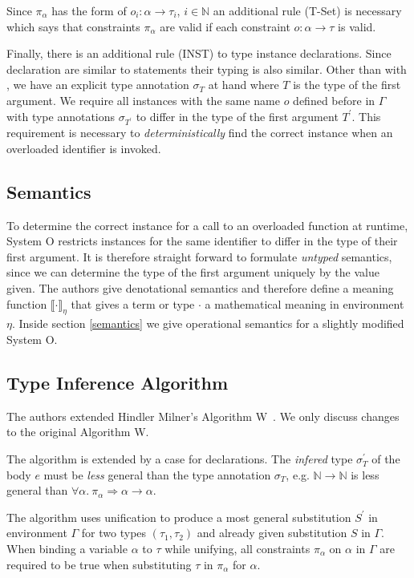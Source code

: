 \documentclass[runningheads]{llncs}
\newcommand{\snip}[1]{\footnotesize{\ttfamily{#1}}}
\begin{document}
Since $\pi_\alpha$ has the form of $o_i : \alpha \rightarrow \tau_i$, $i \in \mathbb{N}$ an additional rule (T-Set) is necessary which says that constraints $\pi_\alpha$ are valid if each constraint $o: \alpha \rightarrow \tau$ is valid.

Finally, there is an additional rule (INST) to type instance declarations. Since \snip{inst} declaration are similar to \snip{let} statements their typing is also similar. Other than with \snip{let}, we have an explicit type annotation $\sigma_T$ at hand where $T$ is the type of the first argument. We require all instances with the same name $o$ defined before in $\Gamma$ with type annotations $\sigma_{T^\prime}$ to differ in the type of the first argument $T^\prime$. This requirement is necessary to \emph{deterministically} find the correct instance when an overloaded identifier is invoked.
\subsection{Semantics}
To determine the correct instance for a call to an overloaded function at runtime, System O restricts instances for the same identifier to differ in the type of their first argument. It is therefore straight forward to formulate \emph{untyped} semantics, since we can determine the type of the first argument uniquely by the value given. The authors give denotational semantics and therefore define a meaning function $\llbracket \cdot \rrbracket_\eta$ that gives a term or type $\cdot$ a mathematical meaning in environment $\eta$. Inside section \ref{semantics} we give operational semantics for a slightly modified System O. 
\subsection{Type Inference Algorithm}
The authors extended Hindler Milner's Algorithm W~\cite{hm78}. We only discuss changes to the original Algorithm W.

The algorithm is extended by a case for \snip{inst} declarations. The \emph{infered} type $\sigma_T^\prime$ of the body $e$ must be \emph{less} general than the type annotation $\sigma_T$, e.g. $\mathbb{N} \rightarrow \mathbb{N}$ is less general than $\forall \alpha. \ \pi_\alpha \Rightarrow \alpha \rightarrow \alpha$.

The algorithm uses unification to produce a most general substitution $S^\prime$ in environment $\Gamma$ for two types $(\tau_1, \tau_2)$ and already given substitution $S$ in $\Gamma$. When binding a variable $\alpha$ to $\tau$ while unifying, all constraints $\pi_\alpha$ on $\alpha$ in $\Gamma$ are required to be true when substituting $\tau$ in $\pi_\alpha$ for $\alpha$.
\end{document}
